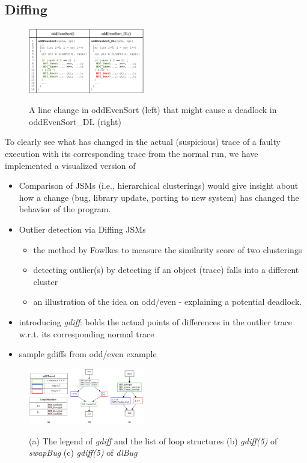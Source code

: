 \clearpage

\subsection{Diffing}

\begin{figure}[]
\centering
\caption{A line change in oddEvenSort (left) that might cause a deadlock in oddEvenSort\_DL (right)}
\includegraphics[width=0.45\textwidth]{figs/oddEvenDL.png}
\label{fig.oddEvenDL}
\end{figure}

To clearly see what has changed in the actual (suspicious) trace of a faulty execution with its corresponding trace from the normal run, we have implemented a visualized version of 

\begin{itemize}
	\item Comparison of JSMs (i.e., hierarchical clusterings) would give insight about how a change (bug, library update, porting to new system) has changed the behavior of the program.
	\item Outlier detection via Diffing JSMs
	\begin{itemize}
		\item the method by Fowlkes to measure the similarity score of two clusterings
		\item detecting outlier(s) by detecting if an object (trace) falls into a different cluster 
		\item an illustration of the idea on odd/even - explaining a potential deadlock.
	\end{itemize}
	\item introducing \textit{gdiff}: bolds the actual points of differences in the outlier trace w.r.t. its corresponding normal trace
	\item sample gdiffs from odd/even example
	
\end{itemize}

\begin{figure}[]
\centering
\caption{(a) The legend of \textit{gdiff} and the list of loop structures (b) \textit{gdiff(5)} of \textit{swapBug} (c) \textit{gdiff(5)} of \textit{dlBug}}
\includegraphics[width=0.45\textwidth]{figs/sampleGdiff.png}
\label{fig.gdiffs}
\end{figure}



